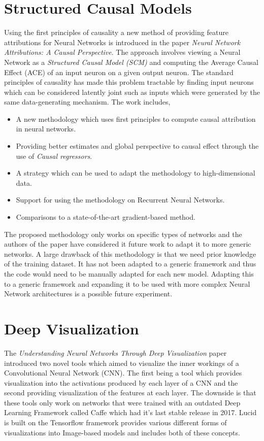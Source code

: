\section{Structured Causal Models}
 Using the first principles of causality \cite{10.5555/1642718} \cite{DBLP:journals/corr/abs-1210-4852} a new method of providing feature attributions for Neural Networks is introduced in the paper \emph{Neural Network Attributions: A Causal Perspective}\cite{DBLP:journals/corr/abs-1902-02302}. The approach involves viewing a Neural Network as a \emph{Structured Causal Model (SCM)} \cite{10.5555/1642718} and computing the Average Causal Effect (ACE) \cite{rubin1978} of an input neuron on a given output neuron. The standard principles of causality has made this problem tractable by finding input neurons which can be considered latently joint such as inputs which were generated by the same data-generating mechanism. The work includes,
 \begin{itemize}
     \item A new methodology which  uses first principles to compute causal attribution in neural networks.
     \item  Providing better estimates and global perspective to causal effect through the use of \emph{Causal regressors}.
     \item  A strategy which can be used to adapt the methodology to high-dimensional data.
     \item Support for using the methodology on Recurrent Neural Networks.
     \item  Comparisons to a state-of-the-art gradient-based method.
 \end{itemize}
The proposed methodology only works on specific types of networks and the authors of the paper have considered it future work to adapt it to more generic networks. A large drawback of this methodology is that we need prior knowledge of the training dataset. It has not been adapted to a generic framework and thus the code would need to be manually adapted for each new model. Adapting this to a generic framework and expanding it to be used with more complex Neural Network architectures is a possible future experiment.

\section{Deep Visualization}
The \emph{Understanding Neural Networks Through Deep Visualization} \cite{DBLP:journals/corr/YosinskiCNFL15} paper introduced two novel tools which aimed to visualize the inner workings of a  Convolutional Neural Network (CNN). The first being a tool which provides visualization into the activations produced  by  each  layer  of a CNN and the second providing visualization of the features at each layer. The downside is that these tools only work on networks that were trained with an outdated Deep Learning Framework called Caffe \cite{jia2014caffe} which had it's last stable release in 2017. Lucid is built on the Tensorflow framework provides various different forms of visualizations into Image-based models and includes both of these concepts.
